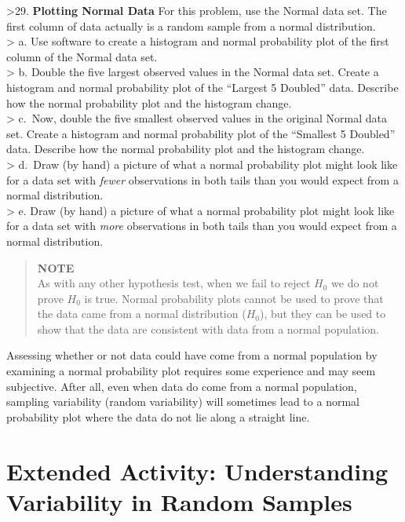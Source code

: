 \documentclass[
]{report}
\begin{document}
\textgreater29. \textbf{Plotting Normal Data} For this problem, use the Normal data set. The first column of data actually is a random sample from a normal distribution.\\
\textgreater{} a. Use software to create a histogram and normal probability plot of the first column of the Normal data set.\\
\textgreater{} b. Double the five largest observed values in the Normal data set. Create a histogram and normal probability plot of the ``Largest 5 Doubled'' data. Describe how the normal probability plot and the histogram change.\\
\textgreater{} c.~Now, double the five smallest observed values in the original Normal data set. Create a histogram and normal probability plot of the ``Smallest 5 Doubled'' data. Describe how the normal probability plot and the histogram change.\\
\textgreater{} d.~Draw (by hand) a picture of what a normal probability plot might look like for a data set with \emph{fewer} observations in both tails than you would expect from a normal distribution.\\
\textgreater{} e. Draw (by hand) a picture of what a normal probability plot might look like for a data set with \emph{more} observations in both tails than you would expect from a normal distribution.

\begin{quote}
\textbf{NOTE}\\
As with any other hypothesis test, when we fail to reject \(H_0\) we do not prove \(H_0\) is true. Normal probability plots cannot be used to prove that the data came from a normal distribution (\(H_0\)), but they can be used to show that the data are consistent with data from a normal population.
\end{quote}

Assessing whether or not data could have come from a normal population by examining a normal probability plot requires some experience and may seem subjective. After all, even when data do come from a normal population, sampling variability (random variability) will sometimes lead to a normal probability plot where the data do not lie along a straight line.

\hypertarget{extended-activity-understanding-variability-in-random-samples}{%
\section*{Extended Activity: Understanding Variability in Random Samples}\label{extended-activity-understanding-variability-in-random-samples}}
\end{document}
